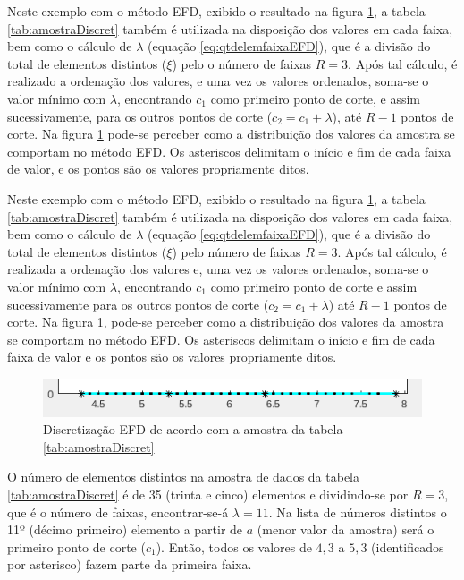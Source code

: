 Neste exemplo com o método EFD, exibido o resultado na figura \ref{fig:faixasFihseririsExemploEFD}, a tabela \ref{tab:amostraDiscret} também é utilizada na disposição dos valores em cada faixa, bem como o cálculo de ${\lambda}$ (equação \ref{eq:qtdelemfaixaEFD}), que é a divisão do total  de elementos distintos (${\xi}$) pelo o número de faixas ${R=3}$. Após tal cálculo, é realizado a ordenação dos valores, e uma  vez os valores ordenados, soma-se o valor mínimo com ${\lambda}$, encontrando ${c_1}$  como primeiro ponto de corte, e assim sucessivamente, para os outros pontos de corte (${c_2=c_1+\lambda}$), até ${R-1}$ pontos de corte. Na figura \ref{fig:faixasFihseririsExemploEFD} pode-se perceber como a distribuição  dos valores da amostra se comportam no método EFD. Os asteriscos delimitam o início e fim de cada faixa de valor, e os pontos são os valores propriamente ditos.

Neste exemplo com o método EFD, exibido o resultado na figura \ref{fig:faixasFihseririsExemploEFD}, a tabela \ref{tab:amostraDiscret} também é utilizada na disposição dos valores em cada faixa, bem como o cálculo de ${\lambda}$ (equação \ref{eq:qtdelemfaixaEFD}), que é a divisão do total de elementos distintos (${\xi}$) pelo  número de faixas ${R=3}$. Após tal cálculo, é realizada a ordenação dos valores e, uma vez os valores ordenados, soma-se o valor mínimo com ${\lambda}$, encontrando ${c_1}$ como primeiro ponto de corte e assim sucessivamente para os outros pontos de corte (${c_2=c_1+\lambda}$) até ${R-1}$ pontos de corte. Na figura \ref{fig:faixasFihseririsExemploEFD}, pode-se perceber como a distribuição dos valores da amostra se comportam no método EFD. Os asteriscos delimitam o início e fim de cada faixa de valor e os pontos são os valores propriamente ditos. 

\begin{figure}[h] 
        \centering
        \includegraphics[scale=0.9]{figs/efd_fisheriris_col1.png}
        \caption{Discretização EFD de acordo com a amostra da tabela \ref{tab:amostraDiscret}}%
        \label{fig:faixasFihseririsExemploEFD}
\end{figure}

O número de elementos distintos na amostra de dados da tabela \ref{tab:amostraDiscret} é de 35 (trinta e cinco) elementos e dividindo-se por ${R=3}$, que é o número de faixas, encontrar-se-á ${\lambda=11}$. Na lista de números distintos o 11º (décimo primeiro) elemento a partir de ${a}$ (menor valor da amostra) será o primeiro ponto de corte (${c_1}$). Então, todos os valores de ${4,3}$ a ${5,3}$ (identificados por asterisco) fazem parte da primeira faixa.

